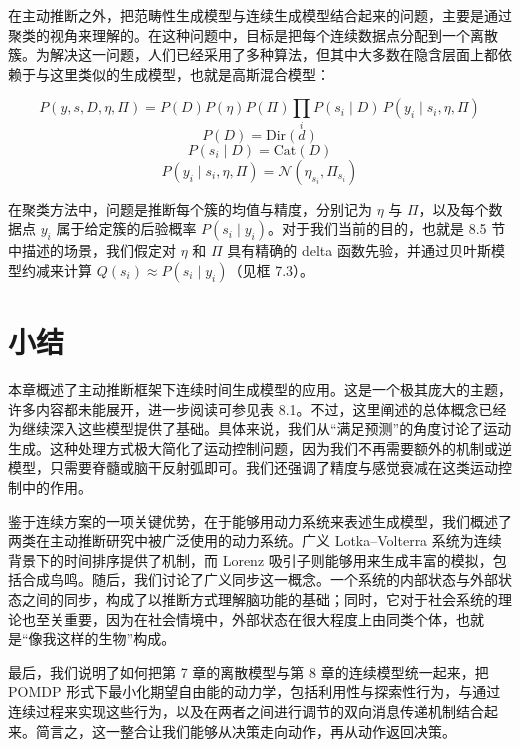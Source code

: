 在主动推断之外，把范畴性生成模型与连续生成模型结合起来的问题，主要是通过聚类的视角来理解的。在这种问题中，目标是把每个连续数据点分配到一个离散簇。为解决这一问题，人们已经采用了多种算法，但其中大多数在隐含层面上都依赖于与这里类似的生成模型，也就是高斯混合模型：

\[
P(y,s,D,\eta,\Pi) = P(D)P(\eta)P(\Pi)\prod_i P(s_i \mid D)\,P(y_i \mid s_i,\eta,\Pi)
\]
\[
P(D) = \mathrm{Dir}(d)
\]
\[
P(s_i \mid D) = \mathrm{Cat}(D)
\]
\[
P(y_i \mid s_i,\eta,\Pi) = \mathcal{N}(\eta_{s_i}, \Pi_{s_i})
\]

在聚类方法中，问题是推断每个簇的均值与精度，分别记为 $\eta$ 与 $\Pi$，以及每个数据点 $y_i$ 属于给定簇的后验概率 $P(s_i \mid y_i)$。对于我们当前的目的，也就是 8.5 节中描述的场景，我们假定对 $\eta$ 和 $\Pi$ 具有精确的 delta 函数先验，并通过贝叶斯模型约减来计算 $Q(s_i) \approx P(s_i \mid y_i)$（见框 7.3）。

\section{小结}

本章概述了主动推断框架下连续时间生成模型的应用。这是一个极其庞大的主题，许多内容都未能展开，进一步阅读可参见表 8.1。不过，这里阐述的总体概念已经为继续深入这些模型提供了基础。具体来说，我们从“满足预测”的角度讨论了运动生成。这种处理方式极大简化了运动控制问题，因为我们不再需要额外的机制或逆模型，只需要脊髓或脑干反射弧即可。我们还强调了精度与感觉衰减在这类运动控制中的作用。

鉴于连续方案的一项关键优势，在于能够用动力系统来表述生成模型，我们概述了两类在主动推断研究中被广泛使用的动力系统。广义 Lotka--Volterra 系统为连续背景下的时间排序提供了机制，而 Lorenz 吸引子则能够用来生成丰富的模拟，包括合成鸟鸣。随后，我们讨论了广义同步这一概念。一个系统的内部状态与外部状态之间的同步，构成了以推断方式理解脑功能的基础；同时，它对于社会系统的理论也至关重要，因为在社会情境中，外部状态在很大程度上由同类个体，也就是“像我这样的生物”构成。

最后，我们说明了如何把第 7 章的离散模型与第 8 章的连续模型统一起来，把 POMDP 形式下最小化期望自由能的动力学，包括利用性与探索性行为，与通过连续过程来实现这些行为，以及在两者之间进行调节的双向消息传递机制结合起来。简言之，这一整合让我们能够从决策走向动作，再从动作返回决策。
